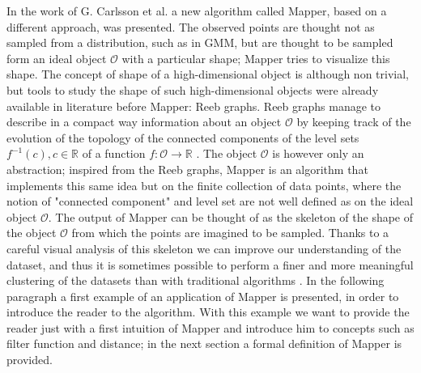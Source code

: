 In the work of G. Carlsson et al. \cite{extracting_insights} a new algorithm called Mapper, based on a different approach, was presented. The observed points are thought not as sampled from a distribution, such as in GMM, but are thought to be sampled form an ideal object $\mathcal{O}$ with a particular shape; Mapper tries to visualize this shape. The concept of shape of a high-dimensional object is although non trivial, but tools to study the shape of such high-dimensional objects were already available in literature before Mapper: Reeb graphs. Reeb graphs manage to describe in a compact way information about an object $\mathcal{O}$ by keeping track of the evolution of the topology of the connected components of the level sets $f^{-1}(c), c\in \mathbb{R}$ of a function $f:\mathcal{O}\rightarrow\mathbb{R}$\cite{reebgraphs} \cite{biasotti}. The object $\mathcal{O}$ is however only an abstraction; inspired from the Reeb graphs, Mapper is an algorithm that implements this same idea but on the finite collection of data points, where the notion of "connected component" and level set are not well defined as on the ideal object $\mathcal{O}$. The output of Mapper can be thought of  as the skeleton of the shape of the object $\mathcal{O}$ from which the points are imagined to be sampled.  Thanks to a careful visual analysis of this skeleton we can improve our understanding of the dataset, and thus it is sometimes possible to perform a finer and more meaningful clustering of the datasets than with traditional algorithms \cite{extracting_insights}. In the following paragraph a first example of an application of Mapper is presented, in order to introduce the reader to the algorithm. With this example we want to provide the reader just with a first intuition of Mapper and introduce him to concepts such as filter function and distance; in the next section a formal definition of Mapper is provided.

